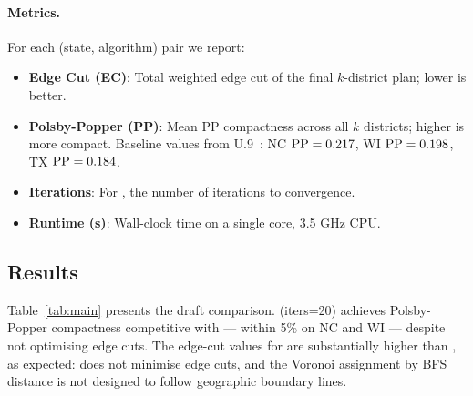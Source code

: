 \paragraph{Metrics.}
For each (state, algorithm) pair we report:
\begin{itemize}
\item \textbf{Edge Cut (EC)}: Total weighted edge cut of the final $k$-district
  plan; lower is better.
\item \textbf{Polsby-Popper (PP)}: Mean PP compactness across all $k$ districts;
  higher is more compact.
  Baseline values from U.9~\citep{h1paper}: NC $\mathrm{PP} = 0.217$, WI $\mathrm{PP} = 0.198$,
  TX $\mathrm{PP} = 0.184$.
\item \textbf{Iterations}: For \cvd{}, the number of iterations to convergence.
\item \textbf{Runtime (s)}: Wall-clock time on a single core, 3.5 GHz CPU.
\end{itemize}

\subsection{Results}

Table~\ref{tab:main} presents the draft comparison.
\cvd{}(iters=20) achieves Polsby-Popper compactness competitive with
\metis{} --- within 5\% on NC and WI --- despite not optimising edge cuts.
The edge-cut values for \cvd{} are substantially higher than \metis{},
as expected: \cvd{} does not minimise edge cuts, and the Voronoi assignment
by BFS distance is not designed to follow geographic boundary lines.

